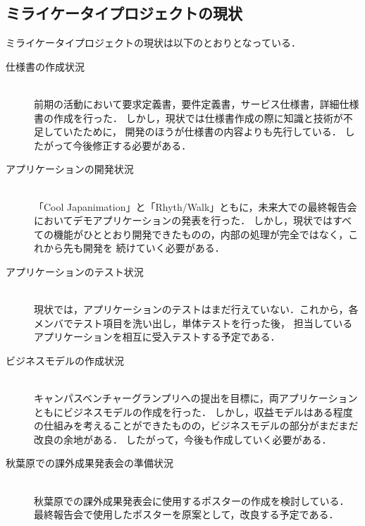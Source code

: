 \subsection{ミライケータイプロジェクトの現状}

ミライケータイプロジェクトの現状は以下のとおりとなっている．

\begin{description}

\item[仕様書の作成状況]\mbox{}\\ 
前期の活動において要求定義書，要件定義書，サービス仕様書，詳細仕様書の作成を行った．
しかし，現状では仕様書作成の際に知識と技術が不足していたために，
開発のほうが仕様書の内容よりも先行している．
したがって今後修正する必要がある．

\item[アプリケーションの開発状況]\mbox{}\\ 
「Cool Japanimation」と「Rhyth/Walk」ともに，未来大での最終報告会においてデモアプリケーションの発表を行った．
しかし，現状ではすべての機能がひととおり開発できたものの，内部の処理が完全ではなく，これから先も開発を
続けていく必要がある．

\item[アプリケーションのテスト状況]\mbox{}\\ 
現状では，アプリケーションのテストはまだ行えていない．これから，各メンバでテスト項目を洗い出し，単体テストを行った後，
担当しているアプリケーションを相互に受入テストする予定である．

\item[ビジネスモデルの作成状況]\mbox{}\\ 
キャンパスベンチャーグランプリへの提出を目標に，両アプリケーションともにビジネスモデルの作成を行った．
しかし，収益モデルはある程度の仕組みを考えることができたものの，ビジネスモデルの部分がまだまだ改良の余地がある．
したがって，今後も作成していく必要がある．

\item[秋葉原での課外成果発表会の準備状況]\mbox{}\\ 
秋葉原での課外成果発表会に使用するポスターの作成を検討している．
最終報告会で使用したポスターを原案として，改良する予定である．

\end{description}

